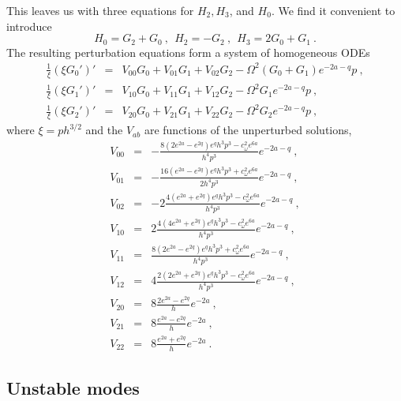 \documentclass[showpacs,preprintnumbers,amsmath,amssymb,floatfix]{revtex4}
\begin{document}
This leaves us with three equations for $H_2, H_3$, and $H_0$.
We find it convenient to introduce
\begin{equation}
H_0 =  G_2 + G_0 \ , \ \ H_2 = -G_2 \ , \ \ H_3 = 2 G_0 +G_1 \ .
\nonumber
\end{equation}
The resulting perturbation equations form a system of homogeneous ODEs
\begin{eqnarray}
\frac{1}{\xi}(\xi G_0')' & = & V_{00} G_0 +V_{01} G_1+V_{02} G_2 -\Omega^2\left(G_0+G_1\right)e^{-2a-q} p \ ,
\label{eqG0}\\
\frac{1}{\xi}(\xi G_1')' & = & V_{10} G_0 +V_{11} G_1+V_{12} G_2 -\Omega^2G_1 e^{-2a-q} p \ ,
\label{eqG1}\\
\frac{1}{\xi}(\xi G_2')' & = & V_{20} G_0 +V_{21} G_1+V_{22} G_2 -\Omega^2G_2 e^{-2a-q} p \ ,
\label{eqG2}
\end{eqnarray}
where $\xi = p h^{3/2}$ 
and the $V_{ab}$ are functions of the unperturbed solutions,
\begin{eqnarray}
V_{00} & = & - \frac{8 ( 2 e^{2a} - e^{2q}) e^q h^3 p^3 - c_\omega^2 e^{6a} }{  h^4 p^3}e^{-2a-q} \label{eqv00} \ , \\
V_{01} & = & - \frac{16(   e^{2a} - e^{2q}) e^q h^3 p^3 + c_\omega^2 e^{6a} }{2 h^4 p^3}e^{-2a-q} \label{eqv01} \ , \\
V_{02} & = & -2\frac{   4( e^{2a} + e^{2q}) e^q h^3 p^3 - c_\omega^2 e^{6a} }{  h^4 p^3}e^{-2a-q} \label{eqv02} \ , \\
V_{10} & = &  2\frac{   4(4e^{2a} + e^{2q}) e^q h^3 p^3 - c_\omega^2 e^{6a} }{  h^4 p^3}e^{-2a-q} \label{eqv10} \ , \\
V_{11} & = &   \frac{8 (2  e^{2a} - e^{2q}) e^q h^3 p^3 + c_\omega^2 e^{6a} }{  h^4 p^3}e^{-2a-q} \label{eqv11} \ , \\
V_{12} & = &  4\frac{   2(2e^{2a} + e^{2q}) e^q h^3 p^3 - c_\omega^2 e^{6a} }{  h^4 p^3}e^{-2a-q} \label{eqv12} \ , \\
V_{20} & = &  8\frac{     2e^{2a} - e^{2q} }{h} e^{-2a}  \label{eqv20} \ , \\
V_{21} & = &  8\frac{      e^{2a} - e^{2q} }{h} e^{-2a}  \label{eqv21} \ , \\
V_{22} & = &  8\frac{      e^{2a} + e^{2q} }{h} e^{-2a}  \label{eqv22} \ .
\end{eqnarray}


\subsection{Unstable modes}
\end{document}
